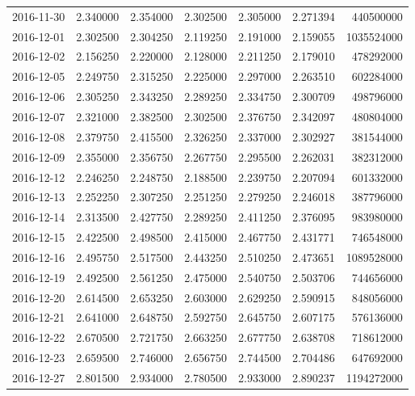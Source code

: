 \begin{tabular}{lrrrrrr}
2016-11-30 &    2.340000 &    2.354000 &    2.302500 &    2.305000 &    2.271394 &   440500000 \\
2016-12-01 &    2.302500 &    2.304250 &    2.119250 &    2.191000 &    2.159055 &  1035524000 \\
2016-12-02 &    2.156250 &    2.220000 &    2.128000 &    2.211250 &    2.179010 &   478292000 \\
2016-12-05 &    2.249750 &    2.315250 &    2.225000 &    2.297000 &    2.263510 &   602284000 \\
2016-12-06 &    2.305250 &    2.343250 &    2.289250 &    2.334750 &    2.300709 &   498796000 \\
2016-12-07 &    2.321000 &    2.382500 &    2.302500 &    2.376750 &    2.342097 &   480804000 \\
2016-12-08 &    2.379750 &    2.415500 &    2.326250 &    2.337000 &    2.302927 &   381544000 \\
2016-12-09 &    2.355000 &    2.356750 &    2.267750 &    2.295500 &    2.262031 &   382312000 \\
2016-12-12 &    2.246250 &    2.248750 &    2.188500 &    2.239750 &    2.207094 &   601332000 \\
2016-12-13 &    2.252250 &    2.307250 &    2.251250 &    2.279250 &    2.246018 &   387796000 \\
2016-12-14 &    2.313500 &    2.427750 &    2.289250 &    2.411250 &    2.376095 &   983980000 \\
2016-12-15 &    2.422500 &    2.498500 &    2.415000 &    2.467750 &    2.431771 &   746548000 \\
2016-12-16 &    2.495750 &    2.517500 &    2.443250 &    2.510250 &    2.473651 &  1089528000 \\
2016-12-19 &    2.492500 &    2.561250 &    2.475000 &    2.540750 &    2.503706 &   744656000 \\
2016-12-20 &    2.614500 &    2.653250 &    2.603000 &    2.629250 &    2.590915 &   848056000 \\
2016-12-21 &    2.641000 &    2.648750 &    2.592750 &    2.645750 &    2.607175 &   576136000 \\
2016-12-22 &    2.670500 &    2.721750 &    2.663250 &    2.677750 &    2.638708 &   718612000 \\
2016-12-23 &    2.659500 &    2.746000 &    2.656750 &    2.744500 &    2.704486 &   647692000 \\
2016-12-27 &    2.801500 &    2.934000 &    2.780500 &    2.933000 &    2.890237 &  1194272000 \\

\end{tabular}
